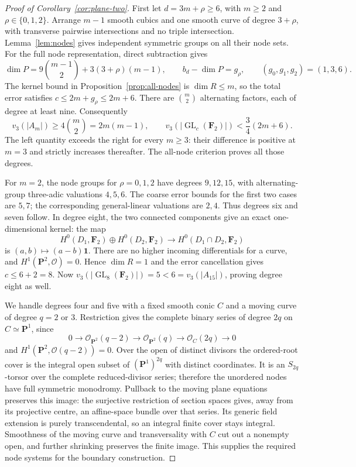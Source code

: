 \documentclass[11pt]{article}
\theoremstyle{remark}\newtheorem{remark}[theorem]{Remark}
\newcommand{\OO}{\mathcal O}
\newcommand{\FF}{\mathbf F}
\newcommand{\PP}{\mathbf P}
\newcommand{\GL}{\operatorname{GL}}
\begin{document}
\begin{proof}[Proof of Corollary~\ref{cor:plane-two}]
First let $d=3m+\rho\ge6$, with $m\ge2$ and $\rho\in\{0,1,2\}$. Arrange $m-1$ smooth cubics and one smooth curve of degree $3+\rho$, with transverse pairwise intersections and no triple intersection. Lemma~\ref{lem:nodes} gives independent symmetric groups on all their node sets. For the full node representation, direct subtraction gives
\[
 \dim P=9\binom{m-1}{2}+3(3+\rho)(m-1),\qquad
 b_d-\dim P=g_\rho,\qquad (g_0,g_1,g_2)=(1,3,6).
\]
The kernel bound in Proposition~\ref{prop:all-nodes} is $\dim R\le m$, so the total error satisfies $c\le2m+g_\rho\le2m+6$. There are $\binom m2$ alternating factors, each of degree at least nine. Consequently
\[
 v_3(|A_m|)\ge4\binom m2=2m(m-1),\qquad
 v_3(|\GL_c(\FF_2)|)<\frac34(2m+6).
\]
The left quantity exceeds the right for every $m\ge3$: their difference is positive at $m=3$ and strictly increases thereafter. The all-node criterion proves all those degrees.

For $m=2$, the node groups for $\rho=0,1,2$ have degrees $9,12,15$, with alternating-group three-adic valuations $4,5,6$. The coarse error bounds for the first two cases are $5,7$; the corresponding general-linear valuations are $2,4$. Thus degrees six and seven follow. In degree eight, the two connected components give an exact one-dimensional kernel: the map
\[
 H^0(D_1,\FF_2)\oplus H^0(D_2,\FF_2)
              \longrightarrow H^0(D_1\cap D_2,\FF_2)
\]
is $(a,b)\mapsto(a-b)\mathbf1$. There are no higher incoming differentials for a curve, and $H^1(\PP^2,\OO)=0$. Hence $\dim R=1$ and the error cancellation gives $c\le6+2=8$. Now
$v_3(|\GL_8(\FF_2)|)=5<6=v_3(|A_{15}|)$, proving degree eight as well.

We handle degrees four and five with a fixed smooth conic $C$ and a moving curve of degree $q=2$ or $3$. Restriction gives the complete binary series of degree $2q$ on $C\simeq\PP^1$, since
\[
 0\longrightarrow\OO_{\PP^2}(q-2)\longrightarrow
 \OO_{\PP^2}(q)\longrightarrow\OO_C(2q)\longrightarrow0
\]
and $H^1(\PP^2,\OO(q-2))=0$. Over the open of distinct divisors the ordered-root cover is the integral open subset of $(\PP^1)^{2q}$ with distinct coordinates. It is an $S_{2q}$-torsor over the complete reduced-divisor series; therefore the unordered nodes have full symmetric monodromy. Pullback to the moving plane equations preserves this image: the surjective restriction of section spaces gives, away from its projective centre, an affine-space bundle over that series. Its generic field extension is purely transcendental, so an integral finite cover stays integral. Smoothness of the moving curve and transversality with $C$ cut out a nonempty open, and further shrinking preserves the finite image. This supplies the required node systems for the boundary construction.


\end{proof}
\end{document}
